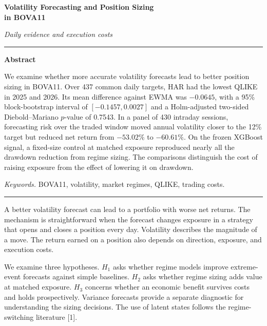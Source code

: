 \documentclass[11pt,letterpaper]{article}
\makeatletter
\renewcommand\section{\@startsection{section}{1}{\z@}{2.5ex plus .4ex}{1.3ex}{\normalfont\normalsize\bfseries}}
\makeatother
\begin{document}
\thispagestyle{primeira}
\vspace*{.65cm}
\begin{center}
{\Large\bfseries Volatility Forecasting and Position Sizing\\[3pt] in BOVA11\par}
\vspace{1.7em}
{\itshape Daily evidence and execution costs\par}
\end{center}
\vspace{1.15em}\hrule\smallskip
\noindent\textbf{Abstract}\par
\begingroup\small
We examine whether more accurate volatility forecasts lead to better position sizing in BOVA11. Over 437 common daily targets, HAR had the lowest QLIKE in 2025 and 2026. Its mean difference against EWMA was $-0.0645$, with a 95\% block-bootstrap interval of $[-0.1457,0.0027]$ and a Holm-adjusted two-sided Diebold--Mariano $p$-value of 0.7543. In a panel of 430 intraday sessions, forecasting risk over the traded window moved annual volatility closer to the 12\% target but reduced net return from $-53.02\%$ to $-60.61\%$. On the frozen XGBoost signal, a fixed-size control at matched exposure reproduced nearly all the drawdown reduction from regime sizing. The comparisons distinguish the cost of raising exposure from the effect of lowering it on drawdown.

\textit{Keywords.} BOVA11, volatility, market regimes, QLIKE, trading costs.
\par\endgroup\smallskip\hrule\medskip

\section{Introduction}
A better volatility forecast can lead to a portfolio with worse net returns. The mechanism is straightforward when the forecast changes exposure in a strategy that opens and closes a position every day. Volatility describes the magnitude of a move. The return earned on a position also depends on direction, exposure, and execution costs.

We examine three hypotheses. $H_1$ asks whether regime models improve extreme-event forecasts against simple baselines. $H_2$ asks whether regime sizing adds value at matched exposure. $H_3$ concerns whether an economic benefit survives costs and holds prospectively. Variance forecasts provide a separate diagnostic for understanding the sizing decisions. The use of latent states follows the regime-switching literature [1].
\end{document}
